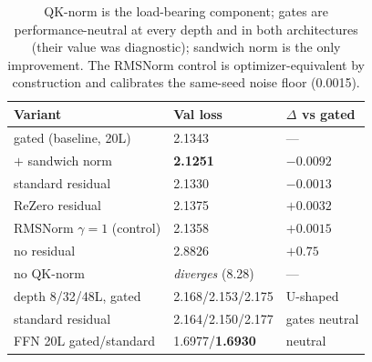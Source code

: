 \begin{table}[tb]\centering\footnotesize
\setlength{\tabcolsep}{3.5pt}
\begin{tabular}{@{}lll@{}}
\toprule
Variant & Val loss & $\Delta$ vs gated \\
\midrule
gated (baseline, 20L) & 2.1343 & --- \\
$+$ sandwich norm & \textbf{2.1251} & $-0.0092$ \\
standard residual & 2.1330 & $-0.0013$ \\
ReZero residual & 2.1375 & $+0.0032$ \\
RMSNorm $\gamma{=}1$ (control) & 2.1358 & $+0.0015$ \\
no residual & 2.8826 & $+0.75$ \\
no QK-norm & \emph{diverges} (8.28) & --- \\
\midrule
depth 8/32/48L, gated & 2.168/2.153/2.175 & U-shaped \\
\quad standard residual & 2.164/2.150/2.177 & gates neutral \\
FFN 20L gated/standard & 1.6977/\textbf{1.6930} & neutral \\
\bottomrule
\end{tabular}
\caption{QK-norm is the load-bearing component; gates are
performance-neutral at every depth and in both architectures (their value
was diagnostic); sandwich norm is the only improvement. The RMSNorm
control is optimizer-equivalent by construction and calibrates the
same-seed noise floor (0.0015).}
\label{tab:ablations}
\end{table}
